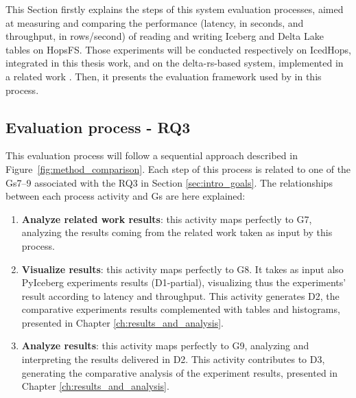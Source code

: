This Section firstly explains the steps of this system evaluation processes, aimed at measuring and comparing the performance (latency, in seconds, and throughput, in rows/second) of reading and writing Iceberg and Delta Lake tables on \gls{HopsFS}. Those experiments will be conducted respectively on IcedHops, integrated in this thesis work, and on the delta-rs-based system, implemented in a related work \cite{manfrediReducingReadWrite2024}. Then, it presents the evaluation framework used by in this process.



\subsection{Evaluation process - RQ3}
\label{subsec:eval_process_iceberg_delta}
This evaluation process will follow a sequential approach described in Figure~\ref{fig:method_comparison}. Each step of this process is related to one of the \glspl{G}7--9 associated with the \gls{RQ}3 in Section \ref{sec:intro_goals}. The relationships between each process activity and \glspl{G} are here explained:
\begin{enumerate}
    \item \textbf{Analyze related work results}: this activity maps perfectly to \gls{G}7, analyzing the results coming from the related work taken as input by this process.
    \item \textbf{Visualize results}: this activity maps perfectly to \gls{G}8. It takes as input also PyIceberg experiments results (\gls{D}1-partial), visualizing thus the experiments' result according to latency and throughput. This activity generates \gls{D}2, the comparative experiments results complemented with tables and histograms, presented in Chapter \ref{ch:results_and_analysis}.
    \item \textbf{Analyze results}: this activity maps perfectly to \gls{G}9, analyzing and interpreting the results delivered in \gls{D}2. This activity contributes to \gls{D}3, generating the comparative analysis of the experiment results, presented in Chapter \ref{ch:results_and_analysis}.
\end{enumerate}
